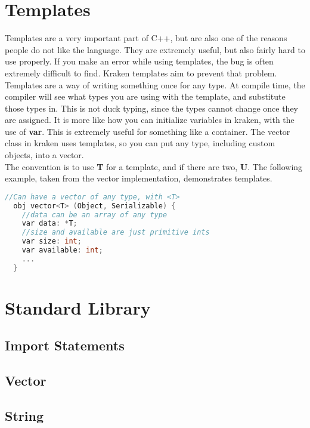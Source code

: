 \documentclass{article}
\begin{document}
\section{Templates}
  Templates are a very important part of C++, but are also one of the reasons
people do not like the language.  They are extremely useful, but also fairly
hard to use properly.  If you make an error while using templates, the bug is
often extremely difficult to find.  Kraken templates aim to prevent that problem.
\\
Templates are a way of writing something once for any type.  At compile time,
the compiler will see what types you are using with the template, and substitute
those types in.  This is not duck typing, since the types cannot change once they
are assigned.  It is more like how you can initialize variables in kraken, with
the use of {\bf{var}}.  This is extremely useful for something like a container.
The vector class in kraken uses templates, so you can put any type, including
custom objects, into a vector. \\
The convention is to use {\bf{T}} for a template, and if there are two,
{\bf{U}}.  The following example, taken from the vector implementation,
demonstrates templates.
\begin{lstlisting}[language=C++]
  //Can have a vector of any type, with <T> 
  obj vector<T> (Object, Serializable) {
    //data can be an array of any type
    var data: *T;
    //size and available are just primitive ints
    var size: int;
    var available: int;
    ...
  }
\end{lstlisting}



\section{Standard Library}
  \subsection{Import Statements}
  \subsection{Vector}
  \subsection{String}
\end{document}
